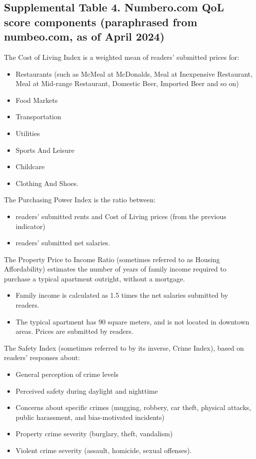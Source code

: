 \documentclass[
  english,
  12pt,
  a4paper,
]{scrartcl}
\providecommand{\tightlist}{%
  \setlength{\itemsep}{0pt}\setlength{\parskip}{0pt}}
\begin{document}
\subsection{Supplemental Table 4. Numbero.com QoL score components
(paraphrased from numbeo.com, as of April
2024)}\label{supplemental-table-4.-numbero.com-qol-score-components-paraphrased-from-numbeo.com-as-of-april-2024}

The Cost of Living Index is a weighted mean of readers' submitted prices
for:

\begin{itemize}
\tightlist
\item
  Restaurants (such as McMeal at McDonalds, Meal at Inexpensive
  Restaurant, Meal at Mid-range Restaurant, Domestic Beer, Imported Beer
  and so on)
\item
  Food Markets
\item
  Transportation
\item
  Utilities
\item
  Sports And Leisure
\item
  Childcare
\item
  Clothing And Shoes.
\end{itemize}

The Purchasing Power Index is the ratio between:

\begin{itemize}
\tightlist
\item
  readers' submitted rents and Cost of Living prices (from the previous
  indicator)
\item
  readers' submitted net salaries.
\end{itemize}

The Property Price to Income Ratio (sometimes referred to as Housing
Affordability) estimates the number of years of family income required
to purchase a typical apartment outright, without a mortgage.

\begin{itemize}
\tightlist
\item
  Family income is calculated as 1.5 times the net salaries submitted by
  readers.
\item
  The typical apartment has 90 square meters, and is not located in
  downtown areas. Prices are submitted by readers.
\end{itemize}

The Safety Index (sometimes referred to by its inverse, Crime Index),
based on readers' responses about:

\begin{itemize}
\tightlist
\item
  General perception of crime levels
\item
  Perceived safety during daylight and nighttime
\item
  Concerns about specific crimes (mugging, robbery, car theft, physical
  attacks, public harassment, and bias-motivated incidents)
\item
  Property crime severity (burglary, theft, vandalism)
\item
  Violent crime severity (assault, homicide, sexual offenses).
\end{itemize}
\end{document}

